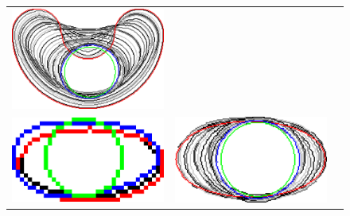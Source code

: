 \begin{figure}[hp!]
\begin{tabular}{ccc}
	\includegraphics[scale=0.25]{figures/chapter5/flow/bean/radius_5/ii/elastica/len_pen_0.01000/jonctions_1/curve_segs_4/best/gs_0.25000/summary.pdf}\\[2em]			

	
	\includegraphics[scale=0.25]{figures/chapter5/flow/ellipse/radius_5/ii/elastica/len_pen_0.01000/jonctions_1/curve_segs_4/best/gs_1.00000/summary.pdf} &

	\includegraphics[scale=0.25]{figures/chapter5/flow/ellipse/radius_5/ii/elastica/len_pen_0.01000/jonctions_1/curve_segs_4/best/gs_0.25000/summary.pdf} &


\end{tabular}
\end{figure}
